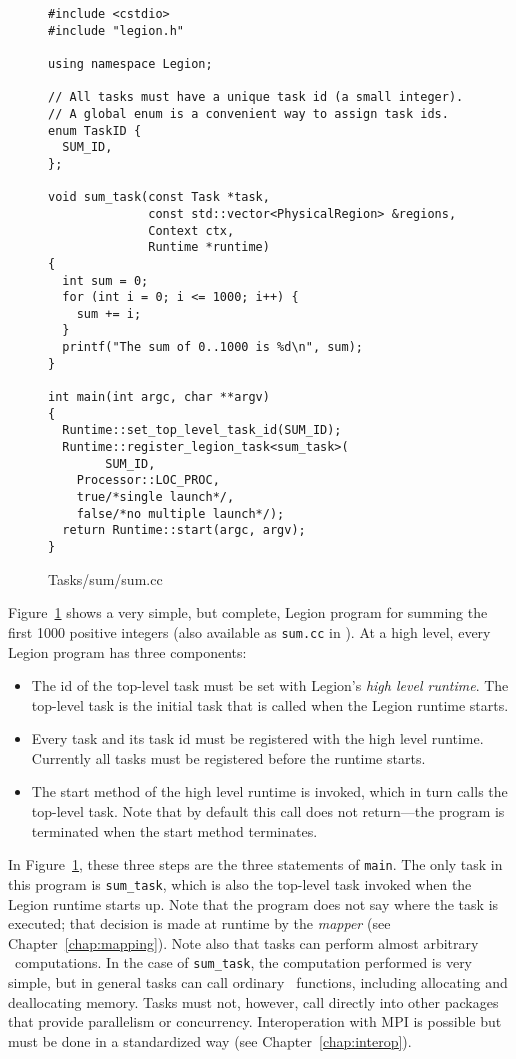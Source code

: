 \begin{figure}
\begin{lstlisting}
#include <cstdio>
#include "legion.h"

using namespace Legion;

// All tasks must have a unique task id (a small integer).
// A global enum is a convenient way to assign task ids.
enum TaskID {
  SUM_ID,
};

void sum_task(const Task *task,
              const std::vector<PhysicalRegion> &regions,
              Context ctx, 
              Runtime *runtime)
{
  int sum = 0;
  for (int i = 0; i <= 1000; i++) {
    sum += i;
  }
  printf("The sum of 0..1000 is %d\n", sum);
}

int main(int argc, char **argv)
{
  Runtime::set_top_level_task_id(SUM_ID);
  Runtime::register_legion_task<sum_task>(
        SUM_ID,
	Processor::LOC_PROC, 
	true/*single launch*/, 
	false/*no multiple launch*/);
  return Runtime::start(argc, argv);
}
\end{lstlisting}
\caption{Tasks/sum/sum.cc}
\label{fig:simple}
\end{figure}

Figure~\ref{fig:simple} shows a very simple, but complete, Legion program for summing
the first 1000 positive integers (also available as {\tt sum.cc} in ).  
At a high level, every Legion program has three components:
\begin{itemize}
\item The id of the top-level task must be set with Legion's {\em high level runtime}.  The top-level
task is the initial task that is called when the Legion runtime starts.
\item Every task and its task id must be registered with the high level runtime.  Currently all tasks
must be registered before the runtime starts.
\item The start method of the high level runtime is invoked, which in turn calls the top-level task.
Note that by default this call does not return---the program is terminated when the start method terminates.
\end{itemize}
In Figure~\ref{fig:simple}, these three steps are the three statements of {\tt main}.  
The only task in this program is {\tt sum\_task}, which is also the top-level task invoked when the
Legion runtime starts up.  Note that the program does not say where the task is executed; that decision is made
at runtime by the {\em mapper} (see Chapter~\ref{chap:mapping}).  Note also that tasks can perform almost arbitrary
\Cpp\ computations.  In the case of {\tt sum\_task}, the computation performed is very simple, but in general tasks
can call ordinary \Cpp\ functions, including allocating and deallocating memory.  Tasks must not, however,
call directly into other packages that provide parallelism or concurrency.  Interoperation with MPI is
possible but must be done in a standardized way (see Chapter~\ref{chap:interop}).  

